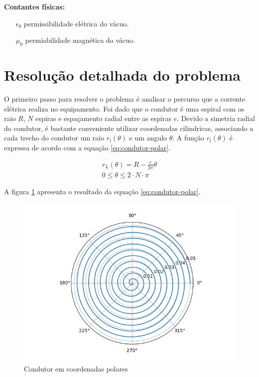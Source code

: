 \documentclass[
	article,			%
	11pt,				%
	oneside,			%
	a4paper,			%
	english,			%
	brazil,				%
	sumario=tradicional
	]{abntex2}
\begin{document}
\textbf{Contantes físicas:}

\begin{itemize}
	\item[$ \epsilon_0 $] permissibilidade elétrica do vácuo.
	\item[$ \mu_0 $] permiabilidade magnética do vácuo.
\end{itemize}

\section{Resolução detalhada do problema}

O primeiro passo para resolver o problema é analisar o percurso que a corrente elétrica realiza no equipamento. Foi dado que o condutor é uma espiral com os raio $ R $, $ N $ espiras e espaçamento radial entre as espiras $ e $. Devido a simetria radial do condutor, é bastante conveniente utilizar coordenadas cilindricas, associando a cada trecho do condutor um raio $ r_l(\theta) $ e um angulo $ \theta $. A função $ r_l(\theta) $ é expressa de acordo com a equação \ref{eq:condutor-polar}.

\begin{equation} \label{eq:condutor-polar}
	\begin{array}{l}
		r_L(\theta) = R - \frac{e}{2\pi} \theta \\
		0 \le \theta \le 2\cdot N \cdot \pi
	\end{array}
\end{equation}

A figura \ref{fig:condutor-polar} apresenta o resultado da equação \ref{eq:condutor-polar}.

\begin{figure}[h]
	\centering
	\includegraphics[width=0.7\linewidth]{figures/espirapolar}
	\caption[Condutor em coordenadas polares]{Condutor em coordenadas polares}
	\label{fig:condutor-polar}
\end{figure}
\end{document}

